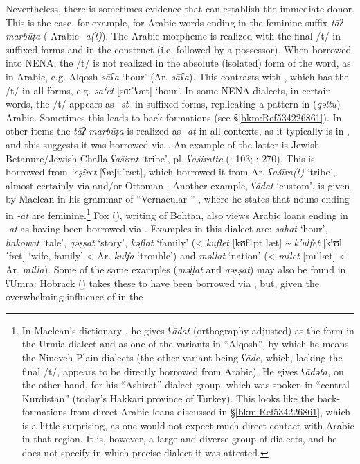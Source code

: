 \documentclass[output=paper]{langsci/langscibook}
\begin{document}
Nevertheless, there is sometimes evidence that can establish the immediate donor. This is the case, for example, for Arabic words ending in the feminine suffix \textit{tāʔ} \textit{marbūṭa} ( Arabic \textit{{}-a(t)}). The Arabic morpheme is realized with the final /t/ in suffixed forms and in the construct (i.e. followed by a possessor). When borrowed into NENA, the /t/ is not realized in the absolute (isolated) form of the word, as in Arabic, e.g. Alqosh \textit{sāʕa} ‘hour’ (Ar. \textit{sāʕa}). This contrasts with , which has the /t/ in all forms, e.g.  \textit{sa‘et} [sɑːˈʕæt] ‘hour’. In some NENA dialects, in certain words, the /t/ appears as \textit{{}-ət-} in suffixed forms, replicating a pattern in (\textit{qəltu}) Arabic. Sometimes this leads to {back-formations} (see §\ref{bkm:Ref534226861}). In other items the \textit{tāʔ} \textit{marbūṭa} is realized as \textit{{}-at} in all contexts, as it typically is in , and this suggests it was borrowed via . An example of the latter is Jewish Betanure/Jewish Challa \textit{ʕaširat} ‘tribe’, pl. \textit{ʕaširatte} (\citealt{Mutzafi2008}: 103; \citealt{Fassberg2010}: 270). This is borrowed from  \textit{‘eşîret} [ʕæʃiːˈræt], which borrowed it from Ar. \textit{ʕašīra(t)} ‘tribe’, almost certainly via  and/or Ottoman . Another example, \textit{ʕādat} ‘custom’, is given by Maclean in his grammar of ``Vernacular '' \citep[35]{Maclean1895}, where he states that nouns ending in \textit{\nobreakdash-at} are feminine.\footnote{\textrm{In Maclean’s dictionary} \textrm{\citep[235]{Maclean1901}, he gives} \textrm{\textit{ʕādat} }\textrm{({orthography} adjusted)}\textrm{ }\textrm{as the form in the  Urmia dialect and as one of the variants in ``Alqosh'', by which he means the Nineveh Plain dialects (the other variant being} \textrm{\textit{ʕāde}}\textrm{, which, lacking the final /t/, appears to be directly borrowed from Arabic). He gives} \textrm{\textit{ʕādəta,}} \textrm{on the other hand, for his ``Ashirat'' dialect group, which was spoken in ``central Kurdistan'' (today’s Hakkari province of Turkey). This looks like the {back-formations} from direct Arabic loans discussed in §\ref{bkm:Ref534226861}, which is a little surprising, as one would not expect much direct contact with Arabic in that region. It is, however, a large and diverse group of dialects, and he does not specify in which precise dialect it was attested.}} Fox (\citeyear[91]{Fox2009}), writing of  Bohtan, also views Arabic loans ending in \textit{{}-at} as having been borrowed via . Examples in this dialect are: \textit{sahat} ‘hour’, \textit{hakowat} ‘tale’, \textit{qəṣṣat} ‘story’, \textit{kəflat} ‘family’ (<  \textit{kuflet} [kʊf\kern 1ptˈlæt] \textit{{\textasciitilde} k’ulfet} [kʰʊlˈfæt] ‘wife, family’ < Ar. \textit{kulfa} ‘trouble’) and \textit{məllat} ‘nation’ (<  \textit{milet} [mɪˈlæt] < Ar. \textit{milla}). Some of the same examples (\textit{məḷḷat} and \textit{qəṣṣat}) may also be found in  ʕUmra: Hobrack (\citeyear[108]{Hobrack2000}) takes these to have been borrowed via , but, given the overwhelming influence of  in the 
\end{document}
